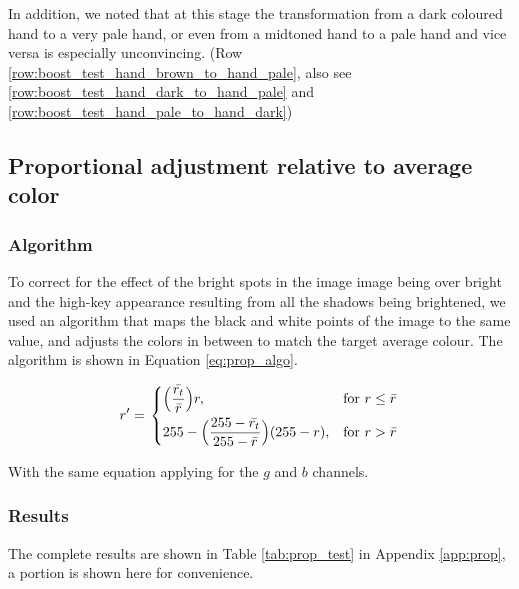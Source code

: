 \documentclass[12pt, a4paper]{article}
\newcommand*\mean[1]{\bar{#1}}
\begin{document}
In addition, we noted that at this stage the transformation from a dark coloured hand to a very pale hand, or even from a midtoned hand to a pale hand and vice versa is especially unconvincing. (Row \ref{row:boost_test_hand_brown_to_hand_pale}, also see \ref{row:boost_test_hand_dark_to_hand_pale} and \ref{row:boost_test_hand_pale_to_hand_dark})

\subsection{Proportional adjustment relative to average color}
\subsubsection{Algorithm}
To correct for the effect of the bright spots in the image image being over bright and the high-key appearance resulting from all the shadows being brightened, we used an algorithm that maps the black and white points of the image to the same value, and adjusts the colors in between to match the target average colour. The algorithm is shown in Equation \ref{eq:prop_algo}.

\begin{equation} \label{eq:prop_algo}
  r' = \left.
  \begin{dcases}
    \displaystyle \Big(\frac{\mean{r_t}}{\mean{r}}\Big)r, & \text{for } r \leq \mean{r} \\
    \displaystyle 255 - 
    \Big(\frac{255 - \mean{r_t}}{255 - \mean{r}}\Big)(255 - r), & \text{for } r > \mean{r} \\
  \end{dcases}
  \right.
\end{equation}

With the same equation applying for the $g$ and $b$ channels.

\subsubsection{Results}
The complete results are shown in Table \ref{tab:prop_test} in Appendix \ref{app:prop}, a portion is shown here for convenience.
\end{document}
